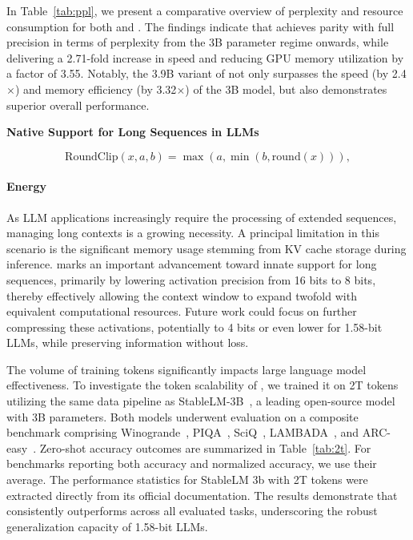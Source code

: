 In Table~\ref{tab:ppl}, we present a comparative overview of perplexity and resource consumption for both  and . The findings indicate that  achieves parity with full precision  in terms of perplexity from the 3B parameter regime onwards, while delivering a 2.71-fold increase in speed and reducing GPU memory utilization by a factor of 3.55. Notably, the 3.9B variant of  not only surpasses the speed (by 2.4$\times$) and memory efficiency (by 3.32$\times$) of the  3B model, but also demonstrates superior overall performance.

\textbf{Native Support for Long Sequences in LLMs}

\begin{equation}
    \mathrm{RoundClip}(x, a, b) = \max(a, \min(b, \mathrm{round}(x))),
\end{equation}

\paragraph{Energy}

As LLM applications increasingly require the processing of extended sequences, managing long contexts is a growing necessity. A principal limitation in this scenario is the significant memory usage stemming from KV cache storage during inference.  marks an important advancement toward innate support for long sequences, primarily by lowering activation precision from 16 bits to 8 bits, thereby effectively allowing the context window to expand twofold with equivalent computational resources. Future work could focus on further compressing these activations, potentially to 4 bits or even lower for 1.58-bit LLMs, while preserving information without loss.

The volume of training tokens significantly impacts large language model effectiveness. To investigate the token scalability of , we trained it on 2T tokens utilizing the same data pipeline as StableLM-3B~\cite{StableLM-3B-4E1T}, a leading open-source model with 3B parameters. Both models underwent evaluation on a composite benchmark comprising Winogrande~\cite{winoGrande}, PIQA~\cite{piqa}, SciQ~\cite{sciq}, LAMBADA~\cite{lambada}, and ARC-easy~\cite{arc}. Zero-shot accuracy outcomes are summarized in Table~\ref{tab:2t}. For benchmarks reporting both accuracy and normalized accuracy, we use their average. The performance statistics for StableLM 3b with 2T tokens were extracted directly from its official documentation. The results demonstrate that  consistently outperforms across all evaluated tasks, underscoring the robust generalization capacity of 1.58-bit LLMs.